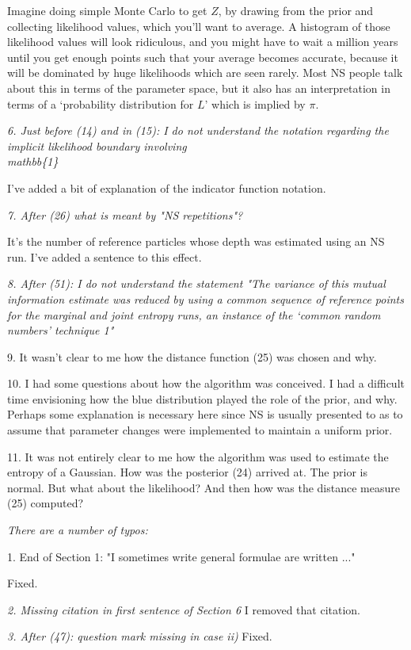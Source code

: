 \documentclass[a4paper, 12pt]{article}
\renewcommand{\quote}{\em}
\begin{document}
Imagine doing simple Monte Carlo to get $Z$, by drawing from the prior and
collecting likelihood values, which you'll want to average. A histogram of
those likelihood values will look ridiculous, and you might have to wait
a million years until you get enough points such that your average becomes
accurate, because it will be dominated by huge likelihoods which are seen
rarely. Most NS people talk about this in terms of the parameter space, but
it also has an interpretation in terms of a `probability distribution for
$L$' which is implied by $\pi$.

{\quote
6. Just before (14) and in (15): I do not understand the notation regarding the implicit likelihood boundary involving \\mathbb\{1\}}

I've added a bit of explanation of the indicator function notation.

{\quote
7. After (26) what is meant by "NS repetitions"?}

It's the number of reference particles
whose depth was estimated using an NS run. I've added a sentence to this effect.

{\quote
8. After (51): I do not understand the statement "The variance of this mutual information estimate was reduced by using a common sequence of reference points for the marginal and joint entropy runs, an instance of the ‘common random numbers’ technique 1"}

9. It wasn't clear to me how the distance function (25) was chosen and why.

10. I had some questions about how the algorithm was conceived.  I had a difficult time envisioning how the blue distribution played the role of the prior, and why.  Perhaps some explanation is necessary here since NS is usually presented to as to assume that parameter changes were implemented to maintain a uniform prior.

11.  It was not entirely clear to me how the algorithm was used to estimate the entropy of a Gaussian.  How was the posterior (24) arrived at.  The prior is normal.  But what about the likelihood?  And then how was the distance measure (25) computed?


{\quote
There are a number of typos:

1. End of Section 1: "I sometimes write general formulae are written ..."}
Fixed.

{\quote
2. Missing citation in first sentence of Section 6}
I removed that citation.

{\quote
3. After (47): question mark missing in case ii)}
Fixed.





\end{document}
